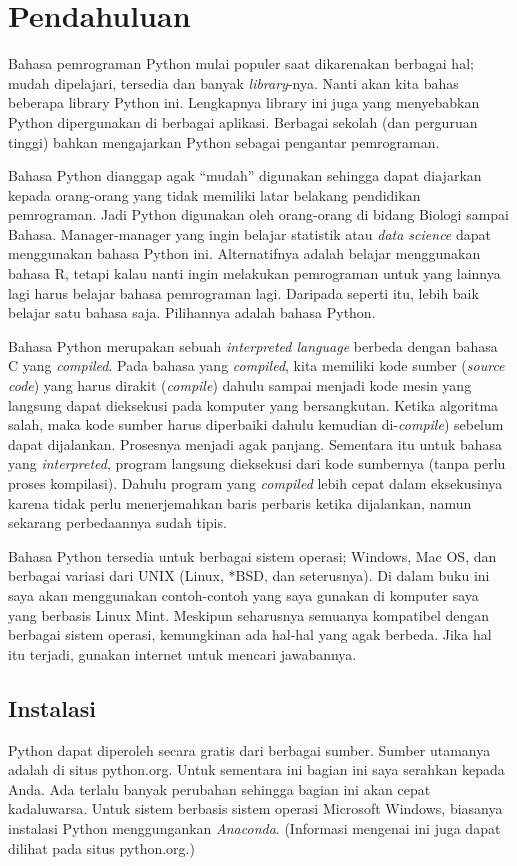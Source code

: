 \chapter{Pendahuluan}
Bahasa pemrograman Python mulai populer saat dikarenakan berbagai hal; mudah
dipelajari, tersedia dan banyak {\em library}-nya. Nanti akan kita bahas beberapa
library Python ini. Lengkapnya library ini juga yang menyebabkan
Python dipergunakan di berbagai aplikasi. Berbagai sekolah (dan
perguruan tinggi) bahkan mengajarkan Python sebagai pengantar pemrograman.

Bahasa Python dianggap agak ``mudah'' digunakan sehingga dapat diajarkan
kepada orang-orang yang tidak memiliki latar belakang pendidikan pemrograman.
Jadi Python digunakan oleh orang-orang di bidang Biologi sampai Bahasa.
Manager-manager yang ingin belajar statistik atau {\em data science}
dapat menggunakan bahasa Python ini.
Alternatifnya adalah belajar menggunakan bahasa R, tetapi kalau 
nanti ingin melakukan pemrograman untuk yang lainnya lagi harus belajar
bahasa pemrograman lagi. Daripada seperti itu, lebih baik belajar satu
bahasa saja. Pilihannya adalah bahasa Python.

Bahasa Python merupakan sebuah {\em interpreted language} berbeda dengan
bahasa C yang {\em compiled}. Pada bahasa yang {\em compiled}, kita memiliki
kode sumber ({\em source code}) yang harus dirakit ({\em compile}) dahulu
sampai menjadi kode mesin yang langsung dapat dieksekusi pada komputer
yang bersangkutan. Ketika algoritma salah, maka kode sumber harus diperbaiki
dahulu kemudian di-{\em compile}) sebelum dapat dijalankan. Prosesnya
menjadi agak panjang. Sementara itu untuk bahasa yang {\em interpreted},
program langsung dieksekusi dari kode sumbernya (tanpa perlu proses kompilasi).
Dahulu program yang {\em compiled} lebih cepat dalam eksekusinya karena
tidak perlu menerjemahkan baris perbaris ketika dijalankan, namun sekarang
perbedaannya sudah tipis.

Bahasa Python tersedia untuk berbagai sistem operasi; Windows, Mac OS, dan
berbagai variasi dari UNIX (Linux, *BSD, dan seterusnya). Di dalam buku ini
saya akan menggunakan contoh-contoh yang saya gunakan di komputer saya yang
berbasis Linux Mint. Meskipun seharusnya semuanya kompatibel dengan berbagai
sistem operasi, kemungkinan ada hal-hal yang agak berbeda. Jika hal itu
terjadi, gunakan internet untuk mencari jawabannya.

\section{Instalasi}
Python dapat diperoleh secara gratis dari berbagai sumber. Sumber utamanya
adalah di situs python.org. Untuk sementara ini bagian ini saya serahkan kepada
Anda. Ada terlalu banyak perubahan sehingga bagian ini akan cepat kadaluwarsa.
Untuk sistem berbasis sistem operasi Microsoft Windows, biasanya instalasi 
Python menggungankan {\em Anaconda}. (Informasi mengenai ini juga dapat
dilihat pada situs python.org.)

